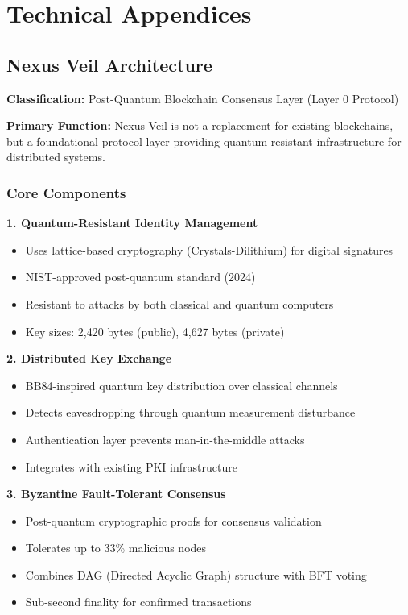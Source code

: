 \documentclass[12pt,oneside]{book}
\begin{document}
\newpage
\appendix

\chapter{Technical Appendices}

\section{Nexus Veil Architecture}

\begin{technote}
\textbf{Classification:} Post-Quantum Blockchain Consensus Layer (Layer 0 Protocol)

\textbf{Primary Function:} Nexus Veil is not a replacement for existing blockchains, but a foundational protocol layer providing quantum-resistant infrastructure for distributed systems.
\end{technote}

\subsection{Core Components}

\textbf{1. Quantum-Resistant Identity Management}
\begin{itemize}
\item Uses lattice-based cryptography (Crystals-Dilithium) for digital signatures
\item NIST-approved post-quantum standard (2024)
\item Resistant to attacks by both classical and quantum computers
\item Key sizes: 2,420 bytes (public), 4,627 bytes (private)
\end{itemize}

\textbf{2. Distributed Key Exchange}
\begin{itemize}
\item BB84-inspired quantum key distribution over classical channels
\item Detects eavesdropping through quantum measurement disturbance
\item Authentication layer prevents man-in-the-middle attacks
\item Integrates with existing PKI infrastructure
\end{itemize}

\textbf{3. Byzantine Fault-Tolerant Consensus}
\begin{itemize}
\item Post-quantum cryptographic proofs for consensus validation
\item Tolerates up to 33\% malicious nodes
\item Combines DAG (Directed Acyclic Graph) structure with BFT voting
\item Sub-second finality for confirmed transactions
\end{itemize}
\end{document}
